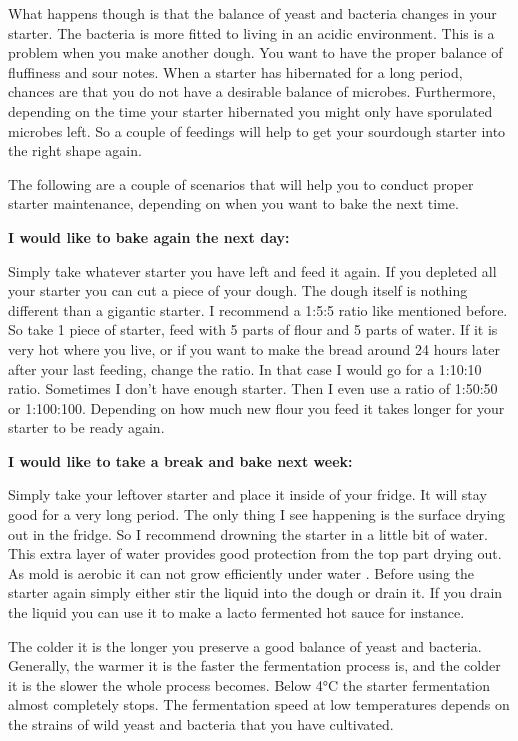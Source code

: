 What happens though is that the balance of yeast and
bacteria changes in your starter. The bacteria is more fitted to living
in an acidic environment. This is a problem when you make another dough.
You want to have the proper balance of fluffiness and sour notes.
When a starter has hibernated for a long period, chances are that
you do not have a desirable balance of microbes.
Furthermore, depending on the time your starter hibernated you might only have
sporulated microbes left. So a couple of feedings will help to get your
sourdough starter into the right shape again.

The following are a couple of scenarios that will help you to conduct proper
starter maintenance, depending on when you want to bake the next time.

\textbf{I would like to bake again the next day:}

Simply take whatever starter you have left and feed it again. If you depleted
all your starter you can cut a piece of your dough. The dough itself is
nothing different than a gigantic starter. I recommend a 1:5:5 ratio like
mentioned before. So take 1 piece of starter, feed with 5 parts of flour and 5
parts of water. If it is very hot where you live, or if you want to make the
bread around 24 hours later after your last feeding, change the ratio. In that
case I would go for a 1:10:10 ratio. Sometimes I don't have enough starter.
Then I even use a ratio of 1:50:50 or 1:100:100. Depending on how much new
flour you feed it takes longer for your starter to be ready again.

\textbf{I would like to take a break and bake next week:}

Simply take your leftover starter and place it inside of your fridge. It will stay good
for a very long period. The only thing I see happening is the surface
drying out in the fridge. So I recommend drowning the starter in a little bit
of water. This extra layer of water provides good protection from the top
part drying out. As mold is aerobic it can not grow efficiently under
water \cite{mold+anaerobic}. Before using the starter again simply either stir
the liquid into the dough or drain it. If you drain the liquid you can use it
to make a lacto fermented hot sauce for instance.

The colder it is the longer you preserve a good balance of yeast and
bacteria. Generally, the warmer it is the faster the fermentation process is,
and the colder it is the slower the whole process becomes.
Below 4°C the starter fermentation almost completely stops. The
fermentation speed at low temperatures depends on the
strains of wild yeast and bacteria
that you have cultivated.

